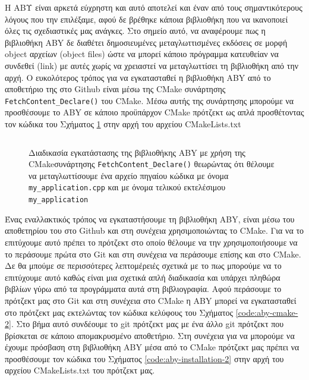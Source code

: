 H ΑΒΥ είναι αρκετά εύχρηστη και αυτό αποτελεί και έναν από τους σημαντικότερους λόγους που την επιλέξαμε, αφού δε βρέθηκε κάποια βιβλιοθήκη που να ικανοποιεί όλες τις σχεδιαστικές μας ανάγκες. Στο σημείο αυτό, να αναφέρουμε πως η βιβλιοθήκη ABY δε διαθέτει δημοσιευμένες μεταγλωττισμένες εκδόσεις σε μορφή object αρχείων (object files) ώστε να μπορεί κάποιο πρόγραμμα κατευθείαν να συνδεθεί (link) με αυτές χωρίς να χρειαστεί να μεταγλωττίσει τη βιβλιοθήκη από την αρχή. Ο ευκολότερος τρόπος για να εγκατασταθεί η βιβλιοθήκη ABY από το αποθετήριο της στο Github είναι μέσω της CMake συνάρτησης \texttt{FetchContent_Declare()} του CMake. Μέσω αυτής της συνάρτησης μπορούμε να προσθέσουμε το ABY σε κάποιο προϋπάρχον CMake πρότζεκτ ως απλά προσθέτοντας τον κώδικα του Σχήματος \ref{code:aby-cmake-1} στην αρχή του αρχείου CMakeLists.txt

\begin{figure}[h!]
    \begin{center}
        \inputminted[fontsize=\scriptsize,frame=single]{bash}{./01_body/code/aby-1.cmake}
    \end{center}
    \caption[Διαδικασία εγκατάστασης της βιβλιοθήκης ABY με χρήση της CMake συνάρτησης
    \texttt{FetchContent_Declare()}]{Διαδικασία εγκατάστασης της βιβλιοθήκης ABY με χρήση της CMakeσυνάρτησης \texttt{FetchContent_Declare()} θεωρώντας ότι θέλουμε να μεταγλωττίσουμε ένα αρχείο πηγαίου κώδικα με όνομα \texttt{my_application.cpp} και με όνομα τελικού εκτελέσιμου \texttt{my_application}}
    \label{code:aby-cmake-1}
\end{figure}

Ένας εναλλακτικός τρόπος να εγκαταστήσουμε τη βιβλιοθήκη ABY, είναι μέσω του αποθετηρίου του στο Github και στη συνέχεια χρησιμοποιώντας το CMake. Για να το επιτύχουμε αυτό πρέπει το πρότζεκτ στο οποίο θέλουμε να την χρησιμοποιήσουμε να το περάσουμε πρώτα στο Git και στη συνέχεια να περάσουμε επίσης και στο CMake. Δε θα μπούμε σε περισσότερες λεπτομέρειές σχετικά με το πως μπορούμε να το επιτύχουμε αυτό καθώς είναι μια σχετικά απλή διαδικασία και υπάρχει πληθώρα βιβλίων γύρω από τα προγράμματα αυτά στη βιβλιογραφία. Αφού περάσουμε το πρότζεκτ μας στο Git και στη συνέχεια στο CMake η ABY μπορεί να εγκατασταθεί στο πρότζεκτ μας εκτελώντας τον κώδικα κελύφους του Σχήματος \ref{code:aby-cmake-2}. Στο βήμα αυτό συνδέουμε το git πρότζεκτ μας με ένα άλλο git πρότζεκτ που βρίσκεται σε κάποιο απομακρυσμένο αποθετήριο. Στη συνέχεια για να μπορούμε να έχουμε πρόσβαση στη βιβλιοθήκη ABY μέσα από το CMake πρότζεκτ μας πρέπει να προσθέσουμε τον κώδικα του Σχήματος \ref{code:aby-installation-2} στην αρχή του αρχείου CMakeLists.txt του πρότζεκτ μας.

